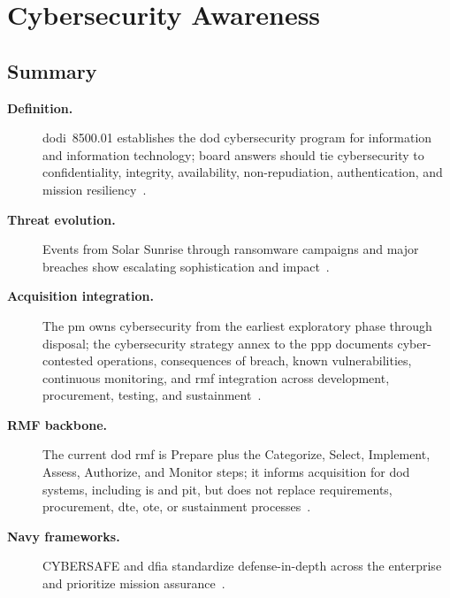 \documentclass[../main.tex]{subfiles}
\begin{document}
\section{Cybersecurity Awareness}

\subsection{Summary}
\begin{description}
  \item[\textbf{Definition.}] \ac{dodi}~8500.01 establishes the \ac{dod} cybersecurity program for information and information technology; board answers should tie cybersecurity to confidentiality, integrity, availability, non-repudiation, authentication, and mission resiliency~\autocite{DoDI8500-01,edo-3-4-3-cybersecurity-awareness-2025}.
  \item[\textbf{Threat evolution.}] Events from Solar Sunrise through ransomware campaigns and major breaches show escalating sophistication and impact~\autocite{edo-3-4-3-cybersecurity-awareness-2025}.
  \item[\textbf{Acquisition integration.}] The \ac{pm} owns cybersecurity from the earliest exploratory phase through disposal; the cybersecurity strategy annex to the \ac{ppp} documents cyber-contested operations, consequences of breach, known vulnerabilities, continuous monitoring, and \ac{rmf} integration across development, procurement, testing, and sustainment~\autocite{DoDI5000-90,edo-3-4-3-cybersecurity-awareness-2025}.
  \item[\textbf{RMF backbone.}] The current \ac{dod} \ac{rmf} is Prepare plus the Categorize, Select, Implement, Assess, Authorize, and Monitor steps; it informs acquisition for \ac{dod} systems, including \ac{is} and \ac{pit}, but does not replace requirements, procurement, \ac{dte}, \ac{ote}, or sustainment processes~\autocite{DoDI8510-01,edo-3-4-3-cybersecurity-awareness-2025}.
  \item[\textbf{Navy frameworks.}] CYBERSAFE and \ac{dfia} standardize defense-in-depth across the enterprise and prioritize mission assurance~\autocite{edo-3-4-3-cybersecurity-awareness-2025}.
\end{description}
\end{document}
